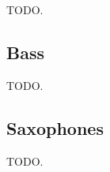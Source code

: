    TODO.

\subsection{Bass}
\label{subsec:cookbook_instruments_bass}

   TODO.

\subsection{Saxophones}
\label{subsec:cookbook_instruments_saxophones}

   TODO.

